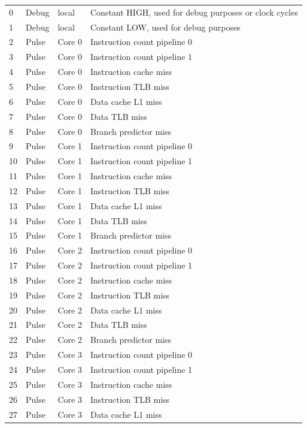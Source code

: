 \begin{center}
\begin{longtable}{|l|l|l|l|}
\hline
0   & Debug   & local  &  Constant HIGH, used for debug purposes or clock cycles \\
1   & Debug   & local  &  Constant LOW, used for debug purposes \\
2   & Pulse   & Core 0 &  Instruction count pipeline 0 \\
3   & Pulse   & Core 0 &  Instruction count pipeline 1 \\
4   & Pulse   & Core 0 &  Instruction cache miss \\
5   & Pulse   & Core 0 &  Instruction TLB miss \\
6   & Pulse   & Core 0 &  Data cache L1 miss \\
7   & Pulse   & Core 0 &  Data TLB miss \\
8   & Pulse   & Core 0 &  Branch predictor miss \\
9   & Pulse   & Core 1 &  Instruction count pipeline 0 \\
10  & Pulse   & Core 1 &  Instruction count pipeline 1 \\
11  & Pulse   & Core 1 &  Instruction cache miss \\
12  & Pulse   & Core 1 &  Instruction TLB miss \\
13  & Pulse   & Core 1 &  Data cache L1 miss \\
14  & Pulse   & Core 1 &  Data TLB miss \\
15  & Pulse   & Core 1 &  Branch predictor miss \\
16  & Pulse   & Core 2 &  Instruction count pipeline 0 \\
17  & Pulse   & Core 2 &  Instruction count pipeline 1 \\
18  & Pulse   & Core 2 &  Instruction cache miss \\
19  & Pulse   & Core 2 &  Instruction TLB miss \\
20  & Pulse   & Core 2 &  Data cache L1 miss \\
21  & Pulse   & Core 2 &  Data TLB miss \\
22  & Pulse   & Core 2 &  Branch predictor miss \\
23  & Pulse   & Core 3 &  Instruction count pipeline 0 \\
24  & Pulse   & Core 3 &  Instruction count pipeline 1 \\
25  & Pulse   & Core 3 &  Instruction cache miss \\
26  & Pulse   & Core 3 &  Instruction TLB miss \\
27  & Pulse   & Core 3 &  Data cache L1 miss \\

\end{longtable}
\end{center}
